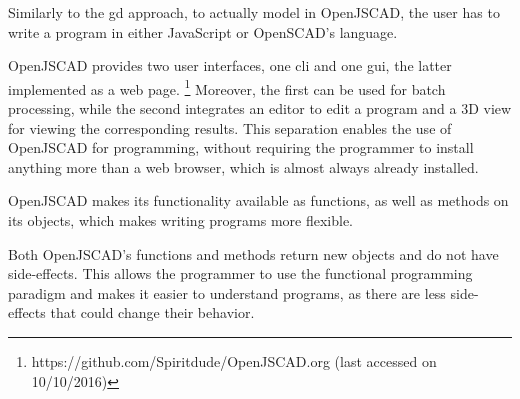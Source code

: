 Similarly to the \gls{gd} approach, to actually model in OpenJSCAD, the user has to write a program in either JavaScript or OpenSCAD's language.


OpenJSCAD provides two user interfaces, one \acrfull{cli} and one \acrfull{gui}, the latter implemented as a web page.%
\footnote{https://github.com/Spiritdude/OpenJSCAD.org (last accessed on 10/10/2016)}
Moreover, the first can be used for batch processing, while the second integrates an editor to edit a program and a 3D view for viewing the corresponding results.
This separation enables the use of OpenJSCAD for programming, without requiring the programmer to install anything more than a web browser, which is almost always already installed.

OpenJSCAD makes its functionality available as functions, as well as methods on its objects, which makes writing programs more flexible.

Both OpenJSCAD's functions and methods return new objects and do not have side-effects.
This allows the programmer to use the functional programming paradigm and makes it easier to understand programs, as there are less side-effects that could change their behavior.



